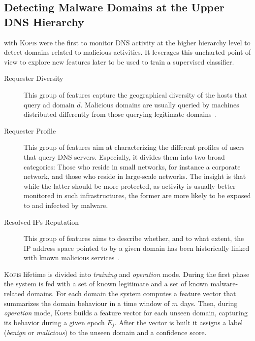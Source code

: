 \subsection{Detecting Malware Domains at the Upper DNS Hierarchy} %
\label{sub:detecting_malware_domains_upper}
\citet{antonakakis2011} with \textsc{Kopis} were the first to monitor DNS activity at
the higher hierarchy level to detect domains related to malicious activities. It
leverages this uncharted point of view to explore new features later to be used to
train a supervised classifier.

\begin{description}
    \item[Requester Diversity] This group of features capture the geographical
        diversity of the hosts that query ad domain $d$. Malicious domains are usually
        queried by machines distributed differently from those querying legitimate
        domains~\cite{schiavoni2013}.
    \item[Requester Profile] This group of features aim at characterizing the
        different profiles of users that query DNS servers. Especially, it divides
        them into two broad categories: Those who reside in small networks, for instance a
        corporate network, and those who reside in large-scale networks. The insight
        is that while the latter should be more protected, as activity is usually
        better monitored in such infrastructures, the former are more
        likely to be exposed to and infected by malware.
    \item[Resolved-IPs Reputation] This group of features aims to describe whether,
        and to what extent, the IP address space pointed to by a given domain has been
        historically linked with known malicious services~\cite{antonakakis2011}.
\end{description}

\textsc{Kopis} lifetime is divided into \emph{training} and \emph{operation} mode.
During the first phase the system is fed with a set of known legitimate and
a set of known malware-related domains. For each domain the system computes a
feature vector that summarizes the domain behaviour in a time window of $m$ days.
Then, during \emph{operation} mode, \textsc{Kopis} builds a feature vector for each
unseen domain, capturing its behavior during a given epoch $E_j$. After the vector
is built it assigns a label (\emph{benign} or \emph{malicious}) to the unseen domain
and a confidence score.

